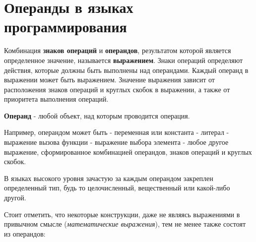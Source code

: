 \section{Операнды в языках программирования}

Комбинация \textbf{знаков операций} и \textbf{операндов}, результатом
которой является определенное значение, называется \textbf{выражением}.
Знаки операций определяют действия, которые должны быть выполнены над
операндами. Каждый операнд в выражении может быть выражением. Значение
выражения зависит от расположения знаков операций и круглых скобок в
выражении, а также от приоритета выполнения операций.

\textbf{Операнд} - любой объект, над которым проводится операция.

Например, операндом может быть - переменная или константа - литерал -
выражение вызова функции - выражение выбора элемента - любое другое
выражение, сформированное комбинацией операндов, знаков операций и
круглых скобок.

В языках высокого уровня зачастую за каждым операндом закреплен
определенный тип, будь то целочисленный, вещественный или какой-либо
другой.

Стоит отметить, что некоторые конструкции, даже не являясь выражениями в
привычном смысле (\emph{математические выражения}), тем не менее также
состоят из операндов:

